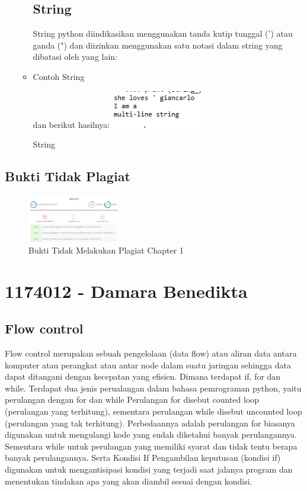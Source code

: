 \begin{enumerate}
\begin{itemize}
\subsection{String}
	\hfill\break
	String python diindikasikan menggunakan tanda kutip tunggal (') atau ganda (") dan diizinkan menggunakan satu notasi dalam string yang dibatasi oleh yang lain:
		\item Contoh String
		\hfill\break
	           
		\hfill\break
		dan berikut hasilnya:
		\includegraphics[width=4cm]{figures/kelompok1/1/anam/string.png}
		\centering
		\caption{String}
	\end{itemize}
\end{enumerate}
\subsection{Bukti Tidak Plagiat}
\begin{figure}[H]
	\includegraphics[width=4cm]{figures/kelompok1/1/anam/plagiat_anam.png}
	\centering
	\caption{Bukti Tidak Melakukan Plagiat Chapter 1}
\end{figure}
\section{1174012 - Damara Benedikta}
\subsection{Flow control }
Flow control merupakan sebuah pengelolaan (data flow) atau aliran data antara komputer atau perangkat atau antar node dalam suatu jaringan sehingga data dapat ditangani dengan kecepatan yang efisien.
Dimana terdapat if, for dan while. Terdapat dua jenis perualangan dalam bahasa pemrograman python, yaitu perulangan dengan for dan while
Perulangan for disebut counted loop (perulangan yang terhitung), sementara perulangan while disebut uncounted loop (perulangan yang tak terhitung). Perbedaannya adalah perulangan for biasanya digunakan untuk mengulangi kode yang sudah diketahui banyak perulangannya. Sementara while untuk perulangan yang memiliki syarat dan tidak tentu berapa banyak perulangannya.
Serta Kondisi If Pengambilan keputusan (kondisi if) digunakan untuk mengantisipasi kondisi yang terjadi saat jalanya program dan menentukan tindakan apa yang akan diambil sesuai dengan kondisi.
\hfill\break

\hfill\break

